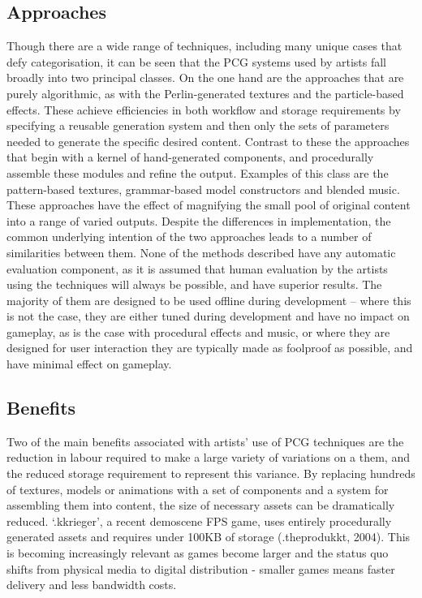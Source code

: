 \documentclass{acm_proc_article-sp}
\begin{document}
\subsection{Approaches}
\label{sec:artist-approaches}
Though there are a wide range of techniques, including many unique cases that defy categorisation, it can be seen that the PCG systems used by artists fall broadly into two principal classes. On the one hand are the approaches that are purely algorithmic, as with the Perlin-generated textures and the particle-based effects. These achieve efficiencies in both workflow and storage requirements by specifying a reusable generation system and then only the sets of parameters needed to generate the specific desired content. Contrast to these the approaches that begin with a kernel of hand-generated components, and procedurally assemble these modules and refine the output. Examples of this class are the pattern-based textures, grammar-based model constructors and blended music. These approaches have the effect of magnifying the small pool of original content into a range of varied outputs.
Despite the differences in implementation, the common underlying intention of the two approaches leads to a number of similarities between them. None of the methods described have any automatic evaluation component, as it is assumed that human evaluation by the artists using the techniques will always be possible, and have superior results. The majority of them are designed to be used offline during development -- where this is not the case, they are either tuned during development and have no impact on gameplay, as is the case with procedural effects and music, or where they are designed for user interaction they are typically made as foolproof as possible, and have minimal effect on gameplay.

\subsection{Benefits}
Two of the main benefits associated with artists' use of PCG techniques are the reduction in labour required to make a large variety of variations on a them, and the reduced storage requirement to represent this variance. By replacing hundreds of textures, models or animations with a set of components and a system for assembling them into content, the size of necessary assets can be dramatically reduced. `.kkrieger', a recent demoscene FPS game, uses entirely procedurally generated assets and requires under 100KB of storage (.theprodukkt, 2004). This is becoming increasingly relevant as games become larger and the status quo shifts from physical media to digital distribution - smaller games means faster delivery and less bandwidth costs. %
\end{document}
